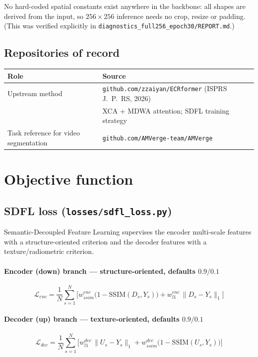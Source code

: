 \documentclass[10pt,a4paper]{article}
\newcommand{\code}[1]{\texttt{#1}}
\begin{document}
No hard-coded spatial constants exist anywhere in the backbone: all shapes are derived from the
input, so $256\times256$ inference needs no crop, resize or padding. (This was verified explicitly
in \code{diagnostics\_full256\_epoch30/REPORT.md}.)

\subsection{Repositories of record}

\begin{center}
\begin{tabular}{@{}ll@{}}
\hline
Role & Source \\
\hline
Upstream method & \code{github.com/zzaiyan/ECRformer} (ISPRS J.~P.~RS, 2026) \\
  & XCA + MDWA attention; SDFL training strategy \\
Task reference for video segmentation & \code{github.com/AMVerge-team/AMVerge} \\
\hline
\end{tabular}
\end{center}

\section{Objective function}

\subsection{SDFL loss (\code{losses/sdfl\_loss.py})}

Semantic-Decoupled Feature Learning supervises the encoder multi-scale features with a
structure-oriented criterion and the decoder features with a texture/radiometric criterion.

\paragraph{Encoder (down) branch --- structure-oriented, defaults $0.9/0.1$}
\begin{equation}
\mathcal{L}_{enc} = \frac{1}{N}\sum_{s=1}^{N}
\Big[ w^{enc}_{ssim}\big(1-\mathrm{SSIM}(D_s, Y_s)\big) + w^{enc}_{l1}\,\|D_s - Y_s\|_1 \Big]
\end{equation}

\paragraph{Decoder (up) branch --- texture-oriented, defaults $0.9/0.1$}
\begin{equation}
\mathcal{L}_{dec} = \frac{1}{N}\sum_{s=1}^{N}
\Big[ w^{dec}_{l1}\,\|U_s - Y_s\|_1 + w^{dec}_{ssim}\big(1-\mathrm{SSIM}(U_s, Y_s)\big) \Big]
\end{equation}
\end{document}
